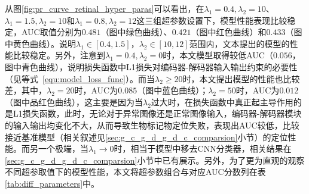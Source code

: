 从图\ref{fig:pr_curve_retinal_hyper_paras}可以看出，在$\lambda_{1}=0.4, \lambda_{2}=10$、$\lambda_{1}=1.5,\lambda_{2}=10$和$\lambda_{1}=0.8,\lambda_{2}=12$这三组超参数设置下，模型性能表现比较稳定，AUC取值分别为$0.481$（图中绿色曲线）、$0.421$（图中红色曲线）和$0.433$（图中黄色曲线）。说明$\lambda_{1}\in [0.4,1.5]$，$\lambda_{2}\in [10,12]$范围内，文本提出的模型的性能比较稳定。另外，注意到$\lambda_{1}=0.4,\lambda_{2}=0$时，本文模型取得较低AUC（$0.056$，图中青色曲线），说明损失函数中L1损失对编码器-解码器输入输出约束的必要性（见等式~\ref{equ:model_loss_func}）。而当$\lambda_{2}\geq 20$时，本文提出模型的性能也比较差，其中，$\lambda_{2}=20$时，AUC为$0.085$（图中蓝色曲线）；$\lambda_{2}=50$时，AUC为$0.012$（图中品红色曲线），这主要是因为当$\lambda_{2}$过大时，在损失函数中真正起主导作用的是L1损失函数，此时，无论对于异常图像还是正常图像输入，编码器-解码器模块的输入输出均变化不大，从而导致生物标记物定位失败，表现出AUC较低，比较接近基准模型（相关叙述见\ref{sec:g_c_g_d_g_d_c_comparsion}小节）的定位性能。而另一个极端，当$\lambda_{1}\rightarrow 0$时，相当于模型中移去CNN分类器，相关结果在\ref{sec:g_c_g_d_g_d_c_comparsion}小节中已有展示。另外，为了更为直观的观察不同超参取值下的模型性能，本文将超参数组合与对应AUC分数列在表\ref{tab:diff_parameters}中。

\begin{table}[h]
	\centering
	\caption{不同超参数组合下，本文提出的模型在二类视网膜糖尿病病变数据集上计算得到的AUC分数列表。}		
	\label{tab:diff_parameters}
\end{table}

